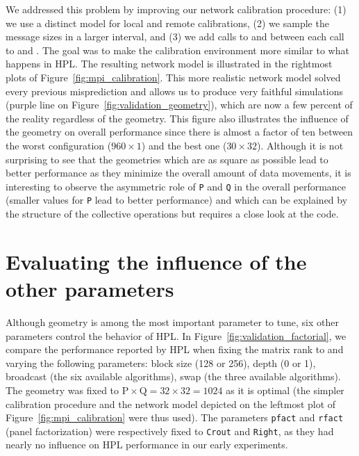         We addressed this problem by improving our network calibration procedure: (1) we use a distinct model for local
        and remote calibrations, (2) we sample the message sizes in a larger interval, and (3) we add calls to \dgemm
        and \iprobe between each call to \send and \recv. The goal was to make the calibration environment
        more similar to what happens in HPL\@.  The resulting network model is illustrated in the rightmost plots of
        Figure~\ref{fig:mpi_calibration}.  This more realistic network model solved every previous misprediction and
        allows us to produce very faithful simulations (purple line on Figure~\ref{fig:validation_geometry}), which are
        now a few percent of the reality regardless of the geometry.  This figure also illustrates the influence of the
        geometry on overall performance since there is almost a factor of ten between the worst configuration
        (\(960\times1\)) and the best one (\(30\times32\)). Although it is not surprising to see that the geometries
        which are as square as possible lead to better performance as they minimize the overall amount of data
        movements, it is interesting to observe the asymmetric role of \texttt{P} and \texttt{Q} in the overall
        performance (smaller values for \texttt{P} lead to better performance) and which can be explained by the
        structure of the collective operations but requires a close look at the code.

    \section{Evaluating the influence of the other parameters}%
    \label{sec:factorial_experiment}

        Although geometry is among the most important parameter to tune, six other parameters control the behavior of
        HPL. In Figure~\ref{fig:validation_factorial}, we compare the performance reported by HPL when fixing the matrix
        rank to  and varying the following parameters: block size (128 or 256), depth (0 or 1), broadcast
        (the six available algorithms), swap (the three available algorithms). The geometry was fixed to
        \(\text{P}\times\text{Q}=32\times32=1024\) as it is optimal (the simpler calibration procedure and the network
        model depicted on the leftmost plot of Figure~\ref{fig:mpi_calibration} were thus used). The parameters
        \texttt{pfact} and \texttt{rfact} (panel factorization) were respectively fixed to \texttt{Crout} and
        \texttt{Right}, as they had nearly no influence on HPL performance in our early experiments.

